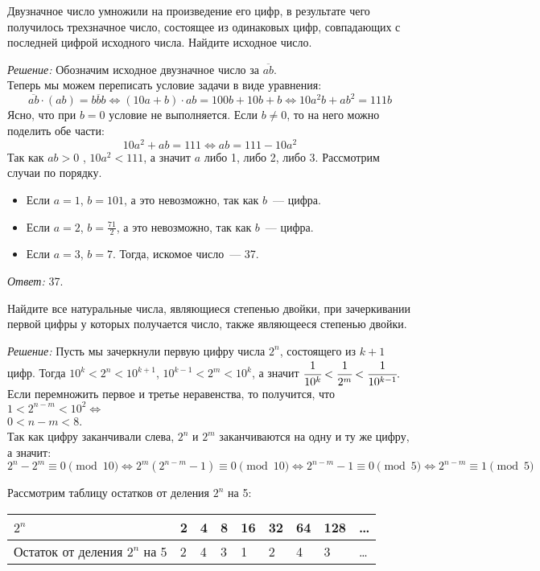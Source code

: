 \documentclass[11pt]{article}
\begin{document}
\begin{example}
	Двузначное число умножили на произведение его цифр, в результате чего получилось трехзначное число, состоящее из одинаковых цифр, совпадающих с последней цифрой исходного числа. Найдите исходное число.
\end{example}
\textit{Решение:}
Обозначим исходное двузначное число за $\overline{ab}$.\\
Теперь мы можем переписать условие задачи в виде уравнения:
\[ \overline{ab} \cdot (ab) = \overline{bbb} \Leftrightarrow
(10a + b) \cdot ab = 100b + 10b + b \Leftrightarrow
10a^2b + ab^2 = 111b \]
Ясно, что при $b = 0$ условие не выполняется. Если $b \neq 0$, то на него можно поделить обе части:
\[10a^2 + ab = 111 \Leftrightarrow ab = 111 - 10a^2\]
Так как $ab > 0$ , $10a^2 < 111$, а значит $a$ либо 1, либо 2, либо 3. Рассмотрим случаи по порядку.
\begin{itemize}
	\item Если $a = 1$, $b = 101$, а это невозможно, так как $b$~--- цифра.
	\item Если $a = 2$, $b = \frac{71}{2}$, а это невозможно, так как $b$~--- цифра.
	\item Если $a = 3$, $b = 7$. Тогда, искомое число~--- 37.
\end{itemize}
\textit{Ответ:} 37.

\begin{example}
	Найдите все натуральные числа, являющиеся степенью двойки, при зачеркивании первой цифры у которых получается число, также являющееся степенью двойки.
\end{example}
\textit{Решение:}
Пусть мы зачеркнули первую цифру числа $2^n$, состоящего из $k + 1$ цифр. Тогда  $10^k < 2^n < 10^{k + 1}$, $10^{k - 1} < 2^m < 10^k$, а значит $\cfrac{1}{10^k} < \cfrac{1}{2^m} < \cfrac{1}{10^{k - 1}}.$\\
Если перемножить первое и третье неравенства, то получится, что $1 < 2^{n - m} < 10^{2} \Longleftrightarrow$\\ $0 < n - m < 8$.\\
Так как цифру заканчивали слева, $2^n$ и $2^m$ заканчиваются на одну и ту же цифру, а значит:\\
\[2^n - 2^m \equiv 0 \pmod{10} \Leftrightarrow 2^m(2^{n - m} - 1) \equiv 0 \pmod{10} \Leftrightarrow
2^{n - m} - 1 \equiv 0 \pmod 5 \Leftrightarrow 2^{n - m} \equiv 1 \pmod 5 \]

Рассмотрим таблицу остатков от деления $2^n$ на 5:

\begin{center}
\begin{tabular}{ | l | l | l | l | l | l | l | l | l |}
\hline
$2^n$ & 2 & 4 & 8 & 16 & 32 & 64 & 128 & \ldots \\ \hline
Остаток от деления $2^n$ на 5   & 2 & 4 & 3 & 1 & 2 & 4 & 3 & \ldots\\\hline
\end{tabular}
\end{center}
\end{document}
